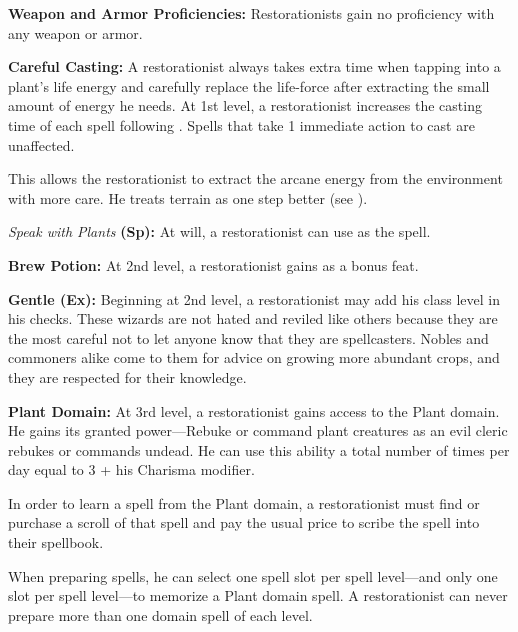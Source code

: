 {
\textbf{Weapon and Armor Proficiencies:} Restorationists gain no proficiency with any weapon or armor.

\textbf{Careful Casting:} A restorationist always takes extra time when tapping into a plant's life energy and carefully replace the life-force after extracting the small amount of energy he needs. At 1st level, a restorationist increases the casting time of each spell following . Spells that take 1 immediate action to cast are unaffected.


This allows the restorationist to extract the arcane energy from the environment with more care. He treats terrain as one step better (see ).

\textit{Speak with Plants} \textbf{(Sp):} At will, a restorationist can use  as the spell.

\textbf{Brew Potion:} At 2nd level, a restorationist gains  as a bonus feat.

\textbf{Gentle (Ex):} Beginning at 2nd level, a restorationist may add his class level in his  checks. These wizards are not hated and reviled like others because they are the most careful not to let anyone know that they are spellcasters. Nobles and commoners alike come to them for advice on growing more abundant crops, and they are respected for their knowledge.

\textbf{Plant Domain:} At 3rd level, a restorationist gains access to the Plant domain. He gains its granted power---Rebuke or command plant creatures as an evil cleric rebukes or commands undead. He can use this ability a total number of times per day equal to 3 + his Charisma modifier.

In order to learn a spell from the Plant domain, a restorationist must find or purchase a scroll of that spell and pay the usual price to scribe the spell into their spellbook. 

When preparing spells, he can select one spell slot per spell level---and only one slot per spell level---to memorize a Plant domain spell. A restorationist can never prepare more than one domain spell of each level.

}
